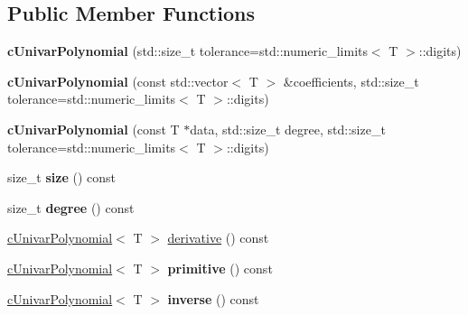 \subsection*{Public Member Functions}
\begin{DoxyCompactItemize}
\item 
\hypertarget{classcUnivarPolynomial_a4ff2b63bc58ec4ab56f270237caf6f0b}{{\bfseries c\-Univar\-Polynomial} (std\-::size\-\_\-t tolerance=std\-::numeric\-\_\-limits$<$ T $>$\-::digits)}\label{classcUnivarPolynomial_a4ff2b63bc58ec4ab56f270237caf6f0b}

\item 
\hypertarget{classcUnivarPolynomial_a967378cb72bc82a047800e9b52051ccd}{{\bfseries c\-Univar\-Polynomial} (const std\-::vector$<$ T $>$ \&coefficients, std\-::size\-\_\-t tolerance=std\-::numeric\-\_\-limits$<$ T $>$\-::digits)}\label{classcUnivarPolynomial_a967378cb72bc82a047800e9b52051ccd}

\item 
\hypertarget{classcUnivarPolynomial_aa32abc2e773a74b65e960a24cf65f70b}{{\bfseries c\-Univar\-Polynomial} (const T $\ast$data, std\-::size\-\_\-t degree, std\-::size\-\_\-t tolerance=std\-::numeric\-\_\-limits$<$ T $>$\-::digits)}\label{classcUnivarPolynomial_aa32abc2e773a74b65e960a24cf65f70b}

\item 
\hypertarget{classcUnivarPolynomial_adbabe3b2fa5052c19f87327de092c8fb}{size\-\_\-t {\bfseries size} () const }\label{classcUnivarPolynomial_adbabe3b2fa5052c19f87327de092c8fb}

\item 
\hypertarget{classcUnivarPolynomial_ad4b0b24cc9229a9b96eb71e224db8c03}{size\-\_\-t {\bfseries degree} () const }\label{classcUnivarPolynomial_ad4b0b24cc9229a9b96eb71e224db8c03}

\item 
\hyperlink{classcUnivarPolynomial}{c\-Univar\-Polynomial}$<$ T $>$ \hyperlink{classcUnivarPolynomial_af0fa0596f636515bcab1e2dedc2fde79}{derivative} () const 
\item 
\hypertarget{classcUnivarPolynomial_a9eabafc8d312e0fab838de2b488c3c0f}{\hyperlink{classcUnivarPolynomial}{c\-Univar\-Polynomial}$<$ T $>$ {\bfseries primitive} () const }\label{classcUnivarPolynomial_a9eabafc8d312e0fab838de2b488c3c0f}

\item 
\hypertarget{classcUnivarPolynomial_adc403a66d40a9f5689089ac401a71484}{\hyperlink{classcUnivarPolynomial}{c\-Univar\-Polynomial}$<$ T $>$ {\bfseries inverse} () const }\label{classcUnivarPolynomial_adc403a66d40a9f5689089ac401a71484}


\end{DoxyCompactItemize}

